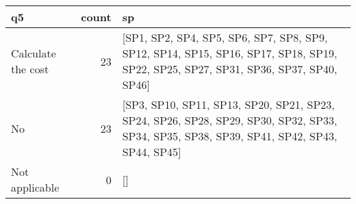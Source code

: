 \begin{tabular}{lrl}
\toprule
                 q5 &  count &                                                                                                                                         sp \\
\midrule
 Calculate the cost &     23 &         [SP1, SP2, SP4, SP5, SP6, SP7, SP8, SP9, SP12, SP14, SP15, SP16, SP17, SP18, SP19, SP22, SP25, SP27, SP31, SP36, SP37, SP40, SP46] \\
                 No &     23 &  [SP3, SP10, SP11, SP13, SP20, SP21, SP23, SP24, SP26, SP28, SP29, SP30, SP32, SP33, SP34, SP35, SP38, SP39, SP41, SP42, SP43, SP44, SP45] \\
     Not applicable &      0 &                                                                                                                                         [] \\
\bottomrule
\end{tabular}
